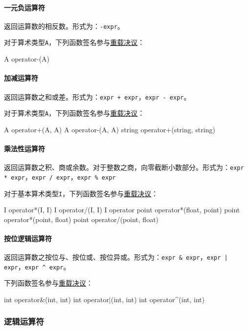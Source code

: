 \documentclass[UTF8]{ctexart}
\begin{document}
\paragraph{一元负运算符} 返回运算数的相反数。形式为：\verb|-expr|。

对于算术类型\verb|A|，下列函数签名参与\hyperref[chongzai]{重载决议}：%
\begin{MUAvbt}
A operator-(A)
\end{MUAvbt}

\paragraph{加减运算符} 返回运算数之和或差。形式为：\verb|expr + expr|，\verb|expr - expr|。

对于算术类型\verb|A|，下列函数签名参与\hyperref[chongzai]{重载决议}：
\begin{MUAvbt}
A operator+(A, A)
A operator-(A, A)
string operator+(string, string)
\end{MUAvbt}

\paragraph{乘法性运算符} 返回运算数之积、商或余数。对于整数之商，向零截断小数部分。形式为：\verb|expr * expr|，\verb|expr / expr|，\verb|expr % expr|

对于基本算术类型\verb|I|，下列函数签名参与\hyperref[chongzai]{重载决议}：
\begin{MUAvbt}
I operator*(I, I)
I operator/(I, I)
I operator%
point operator*(float, point)
point operator*(point, float)
point operator/(point, float)
\end{MUAvbt}

\paragraph{按位逻辑运算符} 返回运算数之按位与、按位或、按位异或。形式为：\verb|expr & expr|，\verb&expr | expr&，\verb|expr ^ expr|。

下列函数签名参与\hyperref[chongzai]{重载决议}：
\begin{MUAvbt}
int operator&(int, int)
int operator|(int, int)
int operator^(int, int)
\end{MUAvbt}

\subsubsection{逻辑运算符}
\label{luoji}
\end{document}
